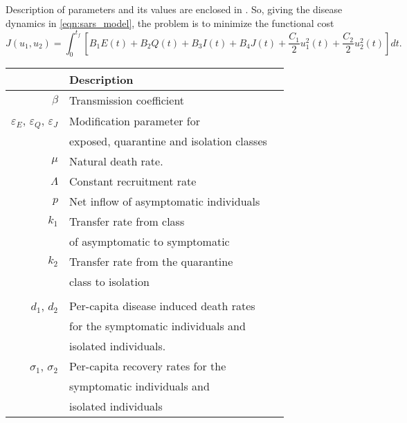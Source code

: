 Description of parameters and its values are enclosed 
in .
So, giving the disease dynamics in \eqref{eqn:sars_model}, the problem is to 
minimize the functional cost
\begin{equation}
  J(u_1,u_2)
    = \int_{0}^{t_f}
      \left[
        B_1 E(t)
        + B_2 Q(t)
        + B_3 I(t)
        + B_4 J(t)
        + \frac{C_1}{2} u_1^2 (t)
        + \frac{C_2}{2} u_2^2 (t)
      \right]
      dt.
\end{equation}
%
\begin{table}[htb]
    \begin{center}
      \begin{tabular}{@{}rll@{}}
        \toprule
        & \multicolumn{1}{l}{\bf{Description}}
        \\
        \midrule
        $\beta$
          & Transmission coefficient
        \\
        $\varepsilon_E$, 
        $\varepsilon_Q$,
        $\varepsilon_J$
          & Modification parameter for 
          \\
          &  exposed, quarantine and isolation classes 
          \\
        $\mu$
          & Natural death rate.
        \\
        $\Lambda$
          & Constant recruitment rate
        \\
        $p$
          & Net inflow of asymptomatic individuals
        \\
        $k_1$ 
          & Transfer rate from class 
          \\
          & of asymptomatic to symptomatic
          \\
        $k_2$
          & Transfer rate from the quarantine 
          \\ 
          & class to isolation
        \\
        \\
        $d_1$, $d_2$
          & Per-capita disease induced death rates 
          \\
          & for the symptomatic individuals and 
          \\
          & isolated individuals.
        \\
        $\sigma_1$, $\sigma_2$
          & Per-capita recovery rates for the 
          \\
          & symptomatic individuals and 
          \\
          &  isolated individuals
        \\

\end{tabular}
\end{center}
\end{table}
